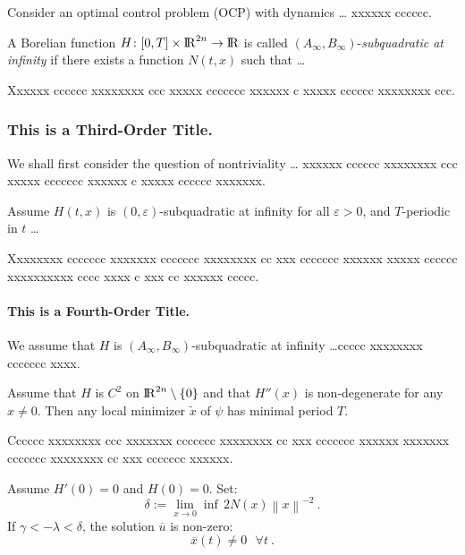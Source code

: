 \documentclass[citeauthoryear]{GTM2020}
\begin{document}
Consider an optimal control problem (OCP) with dynamics \dots
xxxxxx  cccccc.

\begin{definition}\label{d1}
A Borelian function
$H \colon [0,T]\times {\rm I\!R}^{2n} \to {\rm I\!R}$
is called
$(A_{\infty}, B_{\infty})$-{\it sub\-quad\-ratic at infinity\/}
if there exists a function $N(t,x)$ such that \dots
\end{definition}

Xxxxxx cccccc xxxxxxxx ccc xxxxx ccccccc xxxxxx c xxxxx cccccc
xxxxxxxx ccc.

\subsubsection{This is a Third-Order Title.}

We shall first consider the question of nontriviality \dots
xxxxxx cccccc xxxxxxxx ccc xxxxx ccccccc xxxxxx c xxxxx cccccc
xxxxxxx.

\begin{theorem} \label{ghou:pre}
Assume $H(t,x)$ is $(0,\varepsilon )$-sub\-quadratic at
infinity for all $\varepsilon > 0$, and $T$-periodic in $t$ \dots
\end{theorem}

Xxxxxxxx ccccccc xxxxxxx ccccccc xxxxxxxx cc xxx ccccccc xxxxxx
xxxxx cccccc xxxxxxxxxx cccc xxxx c xxx cc xxxxxx ccccc.

\paragraph{This is a Fourth-Order Title.}

We assume that $H$ is
$\left(A_{\infty},B_{\infty}\right)$-sub\-qua\-dra\-tic at infinity
\dots ccccc xxxxxxxx ccccccc xxxx.

\begin{lemma}\label{l1}
Assume that $H$ is $C^{2}$ on ${\rm I\!R}^{2n} \setminus \{ 0\}$ and
that $H'' (x)$ is non-de\-gen\-er\-ate for any $x\ne 0$. Then any local
minimizer $\widetilde{x}$ of $\psi$ has minimal period $T$.
\end{lemma}

Cccccc xxxxxxxx ccc xxxxxxx ccccccc xxxxxxxx cc xxx ccccccc xxxxxx
xxxxxxx ccccccc xxxxxxxx cc xxx ccccccc xxxxxx.

\begin{proposition}\label{pr1}
Assume $H'(0)=0$ and $ H(0)=0$. Set:
\begin{equation}
  \delta := \lim_{x\to 0}\inf\,2 N (x) \left\|x\right\|^{-2}\ .
  \label{eq:one}
\end{equation}
If $\gamma < - \lambda < \delta$,
the solution $\overline{u}$ is non-zero:
\begin{equation}
  \overline{x} (t) \ne 0\ \ \ \forall t\ .
\end{equation}
\end{proposition}
\end{document}
